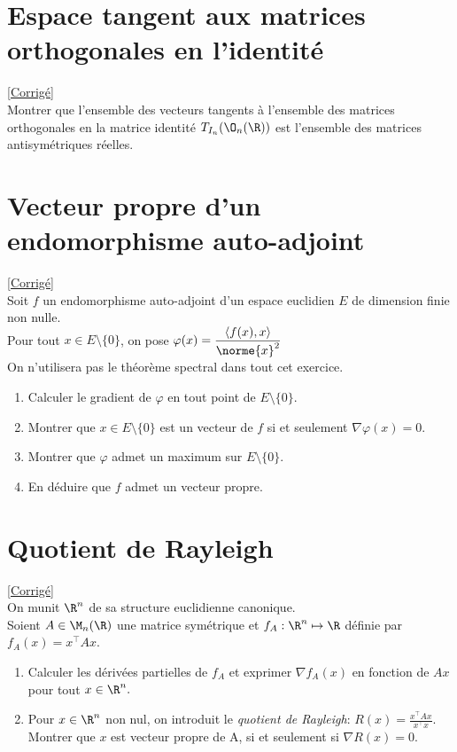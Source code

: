 \documentclass{book}
\begin{document}
\section{Espace tangent aux matrices orthogonales en l'identité}
\label{Espace tangent aux matrices orthogonales en l'identité}
\textcolor{blue}{\hyperref[sec:espace-tangent-aux-matrices-orthogonales-en-lidentite]{[Corrigé]}}\\
Montrer que l'ensemble des vecteurs tangents à l'ensemble des matrices orthogonales en la matrice identité $T_{I_n}(\O_n(\R))$ est l'ensemble des matrices antisymétriques réelles.

\section{Vecteur propre d'un endomorphisme auto-adjoint}
\label{Vecteur propre d'un endomorhpsime auto-adjoint}
\textcolor{blue}{\hyperref[sec:vecteur-propre-dun-endomorphisme-auto-adjoint]{[Corrigé]}}\\
Soit $f$ un endomorphisme auto-adjoint d'un espace euclidien $E$ de dimension finie non nulle.
\\ Pour tout $x\in E \setminus\{0\}$, on pose $\varphi(x)=\displaystyle\frac{\langle f(x),x \rangle}{\norme{x}^2}$
\\ On n'utilisera pas le théorème spectral dans tout cet exercice.
\begin{enumerate}
	\item Calculer le gradient de $\varphi$ en tout point de $E\setminus \{0\}$.
	\item Montrer que $x\in E\setminus \{0\}$ est un vecteur de $f$ si et seulement $\nabla \varphi(x)=0$.
	\item Montrer que $\varphi$ admet un maximum sur $E\setminus \{0\}$.
	\item En déduire que $f$ admet un vecteur propre.
\end{enumerate}

\section{Quotient de Rayleigh}
\label{Quotient de Rayleigh}
\textcolor{blue}{\hyperref[sec:quotient-de-rayleigh]{[Corrigé]}}\\
On munit $\R^n$ de sa structure euclidienne canonique.
\\ Soient $A\in\M_n(\R)$ une matrice symétrique et $f_A: \R^n\mapsto \R$ définie par $f_A(x)=x^\top Ax$.
\begin{enumerate}
	\item Calculer les dérivées partielles de $f_A$ et exprimer $\nabla f_A (x)$ en fonction de $Ax$ pour tout $x\in \R^n.$
	\item Pour $x\in\R^n$ non nul, on introduit le \textit{quotient de Rayleigh}: $R(x)=\displaystyle\frac{x^\top Ax}{x^\top x}$.
	\\Montrer que $x$ est vecteur propre de A, si et seulement si $\nabla R(x)=0$.
\end{enumerate}
\end{document}

